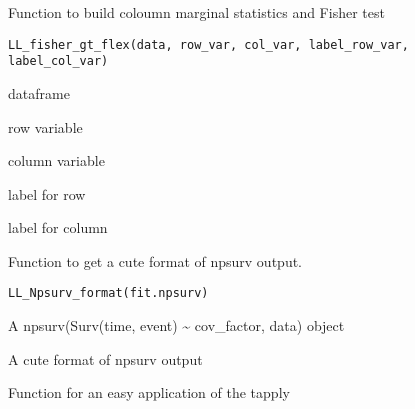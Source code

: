 \documentclass[a4paper]{book}
\begin{document}
%
\begin{Description}
Function to build coloumn marginal statistics and Fisher test
\end{Description}
%
\begin{Usage}
\begin{verbatim}
LL_fisher_gt_flex(data, row_var, col_var, label_row_var, label_col_var)
\end{verbatim}
\end{Usage}
%
\begin{Arguments}
\begin{ldescription}
\item[\code{data}] dataframe

\item[\code{row\_var}] row variable

\item[\code{col\_var}] column variable

\item[\code{label\_row\_var}] label for row

\item[\code{label\_col\_var}] label for column
\end{ldescription}
\end{Arguments}
%
\begin{Description}
Function to get a cute format of npsurv output.
\end{Description}
%
\begin{Usage}
\begin{verbatim}
LL_Npsurv_format(fit.npsurv)
\end{verbatim}
\end{Usage}
%
\begin{Arguments}
\begin{ldescription}
\item[\code{fit.npsurv}] A npsurv(Surv(time, event) \textasciitilde{} cov\_factor, data) object
\end{ldescription}
\end{Arguments}
%
\begin{Value}
A cute format of npsurv output
\end{Value}
%
\begin{Description}
Function for an easy application of the tapply
\end{Description}
\end{document}
